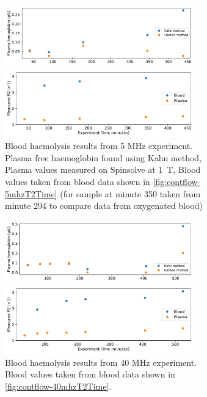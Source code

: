 \begin{figure}[t]
\centering
\begin{subfigure}{\textwidth}
\caption[Blood haemolysis experiment results]{Blood haemolysis results from 5 MHz experiment. Plasma free haemoglobin found using Kahn method, Plasma \Rtwo values measured on Spinsolve at \SI{1}{T}, Blood \Rtwo values taken from blood data shown in \autoref{fig:contflow-5mhzT2Time} (\Ttwo for sample at minute 350 taken from minute 294 to compare data from oxygenated blood)}
\includegraphics[width=0.9\textwidth]{figures/contflow/haemolyseSpect.pdf}

\includegraphics[width=0.9\textwidth]{figures/contflow/haemolysePlasT2.pdf}
\end{subfigure}

\begin{subfigure}{\textwidth}
\caption[Blood haemolysis experiment results from 40 MHz experiment]{Blood haemolysis results from 40 MHz experiment. Blood \Rtwo values taken from blood data shown in \autoref{fig:contflow-40mhzT2Time}.}
\includegraphics[width=0.9\textwidth]{figures/contflow/40haemolyseSpect.pdf}

\includegraphics[width=0.9\textwidth]{figures/contflow/40haemolysePlasT2.pdf}
\end{subfigure}
\caption[Blood haemolysis experiment result]
\label{fig:contflow-haemolyseResult}
\end{figure}

